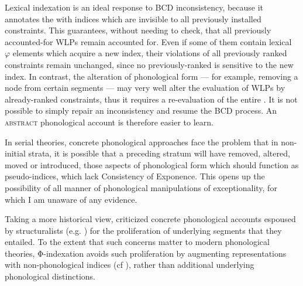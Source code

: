 \documentclass[output=paper,
modfonts
]{LSP/langsci}
\begin{document}
Lexical indexation is an ideal response to BCD inconsistency, because it annotates the  with indices which are invisible to all previously installed constraints. This guarantees, without needing to check, that all previously accounted-for WLPs remain accounted for. Even if some of them contain lexical $\varphi $ elements which acquire a new index, their violations of all previously ranked constraints remain unchanged, since no previously-ranked  is sensitive to the new index. In contrast, the alteration of phonological form — for example, removing a  node from certain segments — may very well alter the evaluation of WLPs by already-ranked constraints, thus it requires a re-evaluation of the entire . It is not possible to simply repair an inconsistency and resume the BCD process. An \textsc{abstract} phonological account is therefore easier to learn. 

In serial theories, concrete phonological approaches face the problem that in non-initial strata, it is possible that a preceding stratum will have removed, altered, moved or introduced, those aspects of phonological form which should function as pseudo-indices, which lack Consistency of Exponence. This opens up the possibility of all manner of phonological manipulations of exceptionality, for which I am unaware of any evidence.

Taking a more historical view, \citet{chomsky1964} criticized concrete phonological accounts espoused by structuralists (e.g. \citealt{bloomfield1939}) for the proliferation of underlying segments that they entailed. To the extent that such concerns matter to modern phonological theories, Φ-indexation avoids such proliferation by augmenting representations with non-phonological indices (cf ), rather than additional underlying phonological distinctions. 
\end{document}
